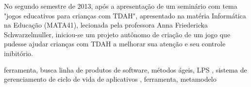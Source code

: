 
No segundo semestre de 2013, ap\'os a apresenta\c{c}\~{a}o de um semin\'{a}rio com tema "jogos educativos para crian\c{c}as com TDAH", apresentado na mat\'eria Inform\'{a}tica na Educa\c{c}\~{a}o (MATA41), lecionada pela professora Anna Friedericka Schwarzelmuller, iniciou-se um projeto aut\^onomo de cria\c{c}\~{a}o de um jogo que pudesse ajudar crian\c{c}as com TDAH a melhorar sua aten\c{c}\~{a}o e seu controle inibit\'orio.


\begin{keywords}
ferramenta, busca
linha de produtos de software, métodos ágeis, LPS , sistema de gerenciamento de ciclo de vida de aplicativos  , ferramenta, metamodelo

\end{keywords}